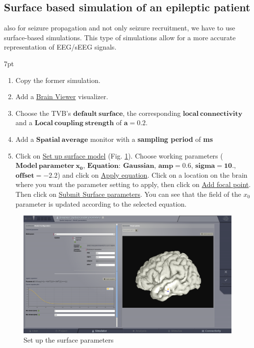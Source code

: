 \documentclass{tufte-handout}
\newenvironment{simulation}{%
  \def\FrameCommand{%
    \hspace{1pt}%
    {\color{ForestGreen}\vrule width 2pt}%
    {\color{simulationshade}\vrule width 4pt}%
    \colorbox{simulationshade}%
  }%
  \MakeFramed{\advance\hsize-\width\FrameRestore}%
  \noindent\hspace{-4.55pt}%
  \begin{adjustwidth}{}{7pt}%
  \vspace{2pt}\vspace{2pt}%
}
{%
  \vspace{2pt}\end{adjustwidth}\endMakeFramed%
}
\begin{document}
\subsection{Surface based simulation of an epileptic patient}

  also for seizure propagation and not only seizure recruitment, we have to use surface-based simulations.
 This type of simulations allow for a more accurate representation of EEG/sEEG signals.
 
  \begin{simulation}
  \begin{enumerate}
  \item Copy the former simulation.
  \item Add a \underline{Brain Viewer} visualizer.
  \item Choose the TVB's $\mathbf{default\:surface}$, the corresponding  $\mathbf{local\:connectivity}$ and a $\mathbf{Local\:coupling\:strength}$ of $\mathbf{a=0.2}$.
  \item Add a $\mathbf{Spatial\:average}$ monitor with a \textbf{sampling period} of \textbf{\unit[1]{ms}}
  \item Click on \underline{Set up surface model} (Fig. \ref{fig:set_up_surface_parameters}). Choose working parameters
  ($\mathbf{Model\:parameter\:x_0}$, $\mathbf{Equation:\:Gaussian}$, $\mathbf{amp=0.6}$, $\mathbf{sigma=10.}$, $\mathbf{offset=-2.2}$) and 
  click on \underline{Apply equation}.
  Click on a location on the brain where you want the parameter setting to apply, then click on \underline{Add focal point}.
  Then click on \underline{Submit Surface parameters}. You can see that the field of the $x_0$ parameter is updated according to the selected equation.
  \end{enumerate}
\end{simulation}

\begin{figure}[h]
  \includegraphics[width=\linewidth]{Handout_UI_ModellingAnEpilepticPatient_SetUpSurfaceParameters}%
  \caption{Set up the surface parameters}%
  \label{fig:set_up_surface_parameters}%
\end{figure}
\end{document}
